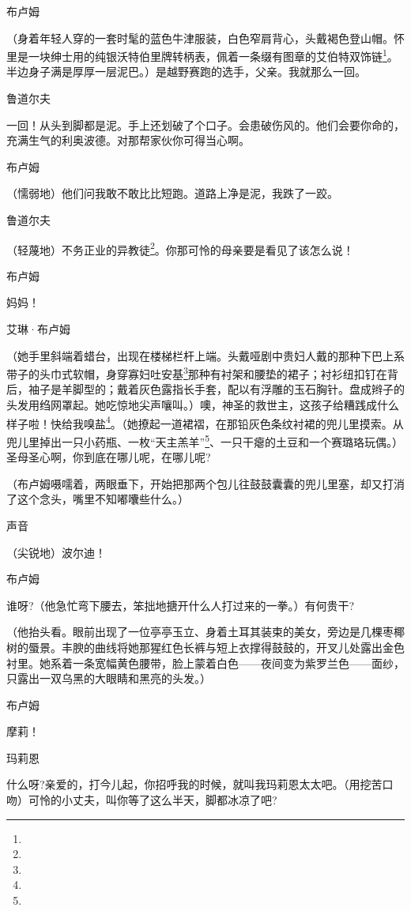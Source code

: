 \par 布卢姆
\par （身着年轻人穿的一套时髦的蓝色牛津服装，白色窄肩背心，头戴褐色登山帽。怀里是一块绅士用的纯银沃特伯里牌转柄表，佩着一条缀有图章的艾伯特双饰链\footnote{}。半边身子满是厚厚一层泥巴。）是越野赛跑的选手，父亲。我就那么一回。
\par 鲁道尔夫
\par 一回！从头到脚都是泥。手上还划破了个口子。会患破伤风的。他们会要你命的，充满生气的利奥波德。对那帮家伙你可得当心啊。
\par 布卢姆
\par （懦弱地）他们问我敢不敢比比短跑。道路上净是泥，我跌了一跤。
\par 鲁道尔夫
\par （轻蔑地）不务正业的异教徒\footnote{}。你那可怜的母亲要是看见了该怎么说！
\par 布卢姆
\par 妈妈！
\par 艾琳·布卢姆
\par （她手里斜端着蜡台，出现在楼梯栏杆上端。头戴哑剧中贵妇人戴的那种下巴上系带子的头巾式软帽，身穿寡妇吐安基\footnote{}那种有衬架和腰垫的裙子；衬衫纽扣钉在背后，袖子是羊脚型的；戴着灰色露指长手套，配以有浮雕的玉石胸针。盘成辫子的头发用绉网罩起。她吃惊地尖声嚷叫。）噢，神圣的救世主，这孩子给糟践成什么样子啦！快给我嗅盐\footnote{}。（她撩起一道裙褶，在那铅灰色条纹衬裙的兜儿里摸索。从兜儿里掉出一只小药瓶、一枚“天主羔羊”\footnote{}、一只干瘪的土豆和一个赛璐珞玩偶。）圣母圣心啊，你到底在哪儿呢，在哪儿呢?
\par （布卢姆嗫嚅着，两眼垂下，开始把那两个包儿往鼓鼓囊囊的兜儿里塞，却又打消了这个念头，嘴里不知嘟囔些什么。）
\par 声音
\par （尖锐地）波尔迪！
\par 布卢姆
\par 谁呀?（他急忙弯下腰去，笨拙地搪开什么人打过来的一拳。）有何贵干?
\par （他抬头看。眼前出现了一位亭亭玉立、身着土耳其装束的美女，旁边是几棵枣椰树的蜃景。丰腴的曲线将她那猩红色长裤与短上衣撑得鼓鼓的，开叉儿处露出金色衬里。她系着一条宽幅黄色腰带，脸上蒙着白色——夜间变为紫罗兰色——面纱，只露出一双乌黑的大眼睛和黑亮的头发。）
\par 布卢姆
\par 摩莉！
\par 玛莉恩
\par 什么呀?亲爱的，打今儿起，你招呼我的时候，就叫我玛莉恩太太吧。（用挖苦口吻）可怜的小丈夫，叫你等了这么半天，脚都冰凉了吧?
